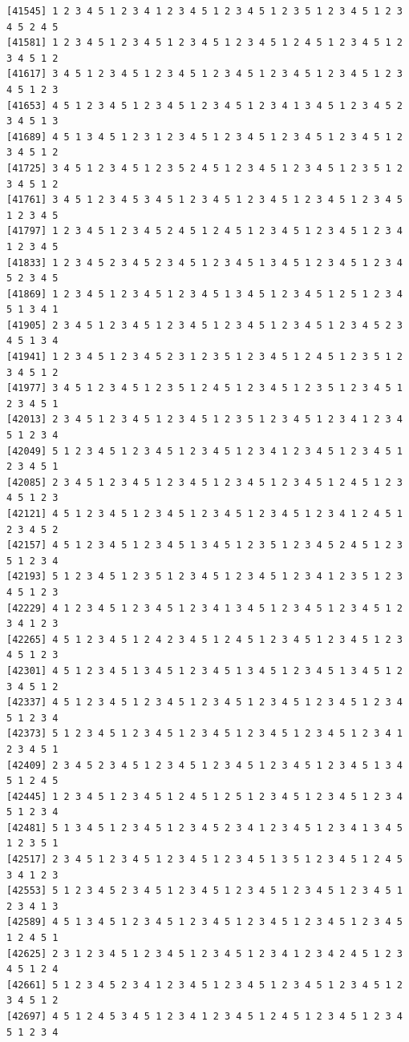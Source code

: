 \documentclass[
  11pt,
]{book}
\begin{document}
\begin{verbatim}
[41545] 1 2 3 4 5 1 2 3 4 1 2 3 4 5 1 2 3 4 5 1 2 3 5 1 2 3 4 5 1 2 3 4 5 2 4 5
[41581] 1 2 3 4 5 1 2 3 4 5 1 2 3 4 5 1 2 3 4 5 1 2 4 5 1 2 3 4 5 1 2 3 4 5 1 2
[41617] 3 4 5 1 2 3 4 5 1 2 3 4 5 1 2 3 4 5 1 2 3 4 5 1 2 3 4 5 1 2 3 4 5 1 2 3
[41653] 4 5 1 2 3 4 5 1 2 3 4 5 1 2 3 4 5 1 2 3 4 1 3 4 5 1 2 3 4 5 2 3 4 5 1 3
[41689] 4 5 1 3 4 5 1 2 3 1 2 3 4 5 1 2 3 4 5 1 2 3 4 5 1 2 3 4 5 1 2 3 4 5 1 2
[41725] 3 4 5 1 2 3 4 5 1 2 3 5 2 4 5 1 2 3 4 5 1 2 3 4 5 1 2 3 5 1 2 3 4 5 1 2
[41761] 3 4 5 1 2 3 4 5 3 4 5 1 2 3 4 5 1 2 3 4 5 1 2 3 4 5 1 2 3 4 5 1 2 3 4 5
[41797] 1 2 3 4 5 1 2 3 4 5 2 4 5 1 2 4 5 1 2 3 4 5 1 2 3 4 5 1 2 3 4 1 2 3 4 5
[41833] 1 2 3 4 5 2 3 4 5 2 3 4 5 1 2 3 4 5 1 3 4 5 1 2 3 4 5 1 2 3 4 5 2 3 4 5
[41869] 1 2 3 4 5 1 2 3 4 5 1 2 3 4 5 1 3 4 5 1 2 3 4 5 1 2 5 1 2 3 4 5 1 3 4 1
[41905] 2 3 4 5 1 2 3 4 5 1 2 3 4 5 1 2 3 4 5 1 2 3 4 5 1 2 3 4 5 2 3 4 5 1 3 4
[41941] 1 2 3 4 5 1 2 3 4 5 2 3 1 2 3 5 1 2 3 4 5 1 2 4 5 1 2 3 5 1 2 3 4 5 1 2
[41977] 3 4 5 1 2 3 4 5 1 2 3 5 1 2 4 5 1 2 3 4 5 1 2 3 5 1 2 3 4 5 1 2 3 4 5 1
[42013] 2 3 4 5 1 2 3 4 5 1 2 3 4 5 1 2 3 5 1 2 3 4 5 1 2 3 4 1 2 3 4 5 1 2 3 4
[42049] 5 1 2 3 4 5 1 2 3 4 5 1 2 3 4 5 1 2 3 4 1 2 3 4 5 1 2 3 4 5 1 2 3 4 5 1
[42085] 2 3 4 5 1 2 3 4 5 1 2 3 4 5 1 2 3 4 5 1 2 3 4 5 1 2 4 5 1 2 3 4 5 1 2 3
[42121] 4 5 1 2 3 4 5 1 2 3 4 5 1 2 3 4 5 1 2 3 4 5 1 2 3 4 1 2 4 5 1 2 3 4 5 2
[42157] 4 5 1 2 3 4 5 1 2 3 4 5 1 3 4 5 1 2 3 5 1 2 3 4 5 2 4 5 1 2 3 5 1 2 3 4
[42193] 5 1 2 3 4 5 1 2 3 5 1 2 3 4 5 1 2 3 4 5 1 2 3 4 1 2 3 5 1 2 3 4 5 1 2 3
[42229] 4 1 2 3 4 5 1 2 3 4 5 1 2 3 4 1 3 4 5 1 2 3 4 5 1 2 3 4 5 1 2 3 4 1 2 3
[42265] 4 5 1 2 3 4 5 1 2 4 2 3 4 5 1 2 4 5 1 2 3 4 5 1 2 3 4 5 1 2 3 4 5 1 2 3
[42301] 4 5 1 2 3 4 5 1 3 4 5 1 2 3 4 5 1 3 4 5 1 2 3 4 5 1 3 4 5 1 2 3 4 5 1 2
[42337] 4 5 1 2 3 4 5 1 2 3 4 5 1 2 3 4 5 1 2 3 4 5 1 2 3 4 5 1 2 3 4 5 1 2 3 4
[42373] 5 1 2 3 4 5 1 2 3 4 5 1 2 3 4 5 1 2 3 4 5 1 2 3 4 5 1 2 3 4 1 2 3 4 5 1
[42409] 2 3 4 5 2 3 4 5 1 2 3 4 5 1 2 3 4 5 1 2 3 4 5 1 2 3 4 5 1 3 4 5 1 2 4 5
[42445] 1 2 3 4 5 1 2 3 4 5 1 2 4 5 1 2 5 1 2 3 4 5 1 2 3 4 5 1 2 3 4 5 1 2 3 4
[42481] 5 1 3 4 5 1 2 3 4 5 1 2 3 4 5 2 3 4 1 2 3 4 5 1 2 3 4 1 3 4 5 1 2 3 5 1
[42517] 2 3 4 5 1 2 3 4 5 1 2 3 4 5 1 2 3 4 5 1 3 5 1 2 3 4 5 1 2 4 5 3 4 1 2 3
[42553] 5 1 2 3 4 5 2 3 4 5 1 2 3 4 5 1 2 3 4 5 1 2 3 4 5 1 2 3 4 5 1 2 3 4 1 3
[42589] 4 5 1 3 4 5 1 2 3 4 5 1 2 3 4 5 1 2 3 4 5 1 2 3 4 5 1 2 3 4 5 1 2 4 5 1
[42625] 2 3 1 2 3 4 5 1 2 3 4 5 1 2 3 4 5 1 2 3 4 1 2 3 4 2 4 5 1 2 3 4 5 1 2 4
[42661] 5 1 2 3 4 5 2 3 4 1 2 3 4 5 1 2 3 4 5 1 2 3 4 5 1 2 3 4 5 1 2 3 4 5 1 2
[42697] 4 5 1 2 4 5 3 4 5 1 2 3 4 1 2 3 4 5 1 2 4 5 1 2 3 4 5 1 2 3 4 5 1 2 3 4

\end{verbatim}
\end{document}
